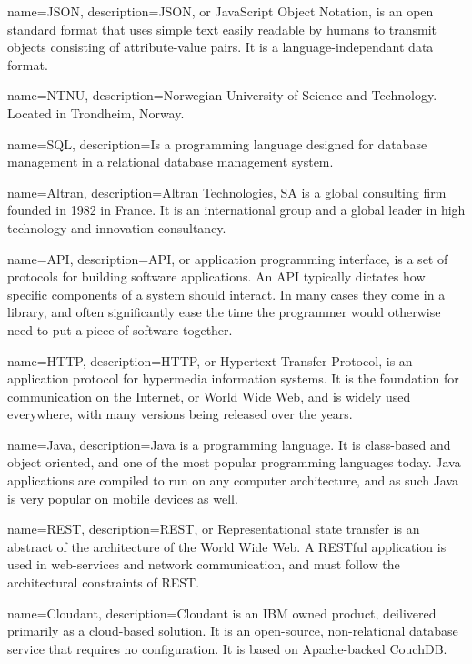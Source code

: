 \documentclass[../document]{subfiles}
\begin{document}
 {
   name=JSON,
   description={JSON, or JavaScript Object Notation, is an open standard format that uses simple text easily readable by humans to transmit objects consisting of attribute-value pairs. It is a language-independant data format.}
}

{
   name=NTNU,
   description={Norwegian University of Science and Technology. Located in Trondheim, Norway.}
}

{
   name=SQL,
   description={Is a programming language designed for database management in a relational database management system.}
}

{
   name=Altran,
   description={Altran Technologies, SA is a global consulting firm founded in 1982 in France. It is an international group and a global leader in high technology and innovation consultancy.}
}

{
   name=API,
   description={API, or application programming interface, is a set of protocols for building software applications. An API typically dictates how specific components of a system should interact. In many cases they come in a library, and often significantly ease the time the programmer would otherwise need to put a piece of software together.}
}

{
   name=HTTP,
   description={HTTP, or Hypertext Transfer Protocol, is an application protocol for hypermedia information systems. It is the foundation for communication on the Internet, or World Wide Web, and is widely used everywhere, with many versions being released over the years.}
}

{
   name=Java,
   description={Java is a programming language. It is class-based and object oriented, and one of the most popular programming languages today. Java applications are compiled to run on any computer architecture, and as such Java is very popular on mobile devices as well.}
}


{
   name=REST,
   description={REST, or Representational state transfer is an abstract of the architecture of the World Wide Web. A RESTful application is used in web-services and network communication, and must follow the architectural constraints of REST.}
}

{
   name=Cloudant,
   description={Cloudant is an IBM owned product, deilivered primarily as a cloud-based solution. It is an open-source, non-relational database service that requires no configuration. It is based on Apache-backed CouchDB.}
}
\end{document}
